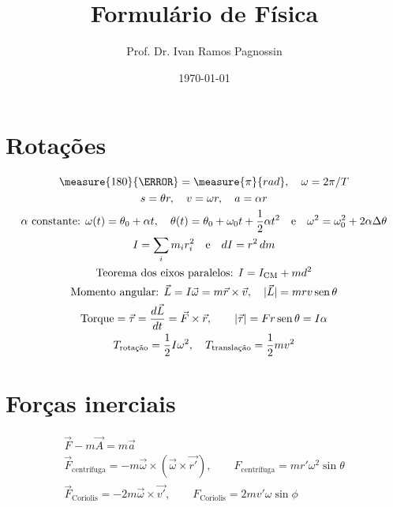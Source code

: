 \documentclass[a4paper,10pt,oneside]{scrartcl}
\title{Formulário de Física}
\author{Prof. Dr. Ivan Ramos Pagnossin}
\date{\today}
\begin{document}
	\section*{Rotações}
	\begin{gather*}
		\measure{180}{\degree} = \measure{\pi}{rad},
			\quad
		\omega = 2\pi/T \\
		s = \theta r, \quad v = \omega r, \quad a = \alpha r \\
		\text{$\alpha$ constante: }\omega(t) = \theta_0 + \alpha t, \quad \theta(t) = \theta_0 + \omega_0 t + \frac{1}{2} \alpha t^2 \quad\text{e}\quad \omega^2 = \omega_0^2 + 2\alpha \Delta\theta \\
		I = \sum_i m_i r_i^2 \quad\text{e}\quad dI = r^2\, dm\\
		\text{Teorema dos eixos paralelos: } I = I_\text{CM} + md^2 \\
		\text{Momento angular: }\vec L = I \vec\omega = m \vec r \times \vec v,
			\quad
		|\vec L| = mrv\sin\theta \\
		\text{Torque} = \vec\tau = \frac{d\vec L}{dt} = \vec F \times \vec r,
			\qquad
		|\vec \tau| = F r \sin\theta = I\alpha \\
		T_\text{rotação} = \frac{1}{2} I \omega^2, \quad T_\text{translação} = \frac{1}{2} m v^2
	\end{gather*}

	\section*{Forças inerciais}
	\begin{gather*}
		\vec F - m \vec A = m \vec a \\
		\vec F_\text{centrífuga} = -m \vec\omega \times \left(\vec\omega \times \vec{r'}\right), \qquad
			F_\text{centrífuga} = m r' \omega^2 \sin\theta \\
		\vec F_\text{Coriolis} = - 2 m \vec\omega \times \vec{v'}, \qquad F_\text{Coriolis} = 2 m v' \omega \sin\phi
	\end{gather*}
\end{document}
